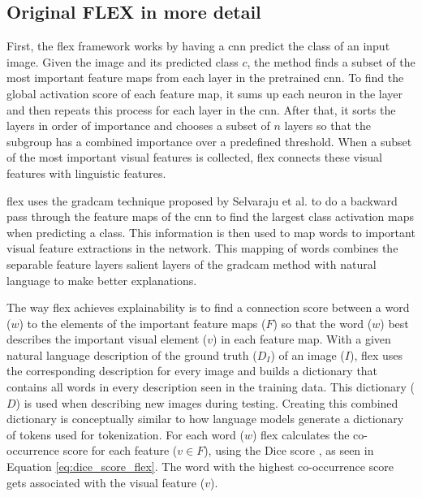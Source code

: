         \subsection{Original FLEX in more detail}
        \label{sec3:flex_detailed}
        First, the \gls{flex} framework works by having a \gls{cnn} predict the class of an input image. Given the image and its predicted class $c$, the method finds a subset of the most important feature maps from each layer in the pretrained \gls{cnn}. To find the global activation score of each feature map, it sums up each neuron in the layer and then repeats this process for each layer in the \gls{cnn}. After that, it sorts the layers in order of importance and chooses a subset of $n$ layers so that the subgroup has a combined importance over a predefined threshold. When a subset of the most important visual features is collected, \gls{flex} connects these visual features with linguistic features. 

        \gls{flex} uses the \gls{gradcam} technique proposed by Selvaraju et al. \cite{selvarajuGradCAMVisualExplanations2020} to do a backward pass through the feature maps of the \gls{cnn} to find the largest class activation maps when predicting a class. This information is then used to map words to important visual feature extractions in the network. This mapping of words combines the separable feature layers salient layers of the \gls{gradcam} method with natural language to make better explanations.
        
        The way \gls{flex} achieves explainability is to find a connection score between a word ($w$) to the elements of the important feature maps ($F$) so that the word ($w$) best describes the important visual element ($v$) in each feature map. With a given natural language description of the ground truth ($D_I$) of an image ($I$), \gls{flex} uses the corresponding description for every image and builds a dictionary that contains all words in every description seen in the training data. This dictionary ($D$) is used when describing new images during testing. 
        Creating this combined dictionary is conceptually similar to how language models generate a dictionary of tokens used for tokenization.
        For each word ($w$) \gls{flex} calculates the co-occurrence score for each feature ($v \in F$), using the Dice score \cite{diceMeasuresAmountEcologic1945, sorensenMethodEstablishingGroups1948}, as seen in Equation \ref{eq:dice_score_flex}. The word with the highest co-occurrence score gets associated with the visual feature ($v$). 
        
